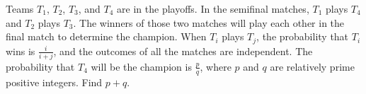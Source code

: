 Teams $T_1$,  $T_2$,  $T_3$,  and $T_4$ are in the playoffs. In the semifinal matches, $T_1$ plays $T_4$ and $T_2$ plays $T_3$. The winners of those two matches will play each other in the final match to determine the champion. When $T_i$ plays $T_j$,  the probability that $T_i$ wins is $\frac{i}{i+j}$,  and the outcomes of all the matches are independent. The probability that $T_4$ will be the champion is $\frac{p}{q}$,  where $p$ and $q$ are relatively prime positive integers. Find $p+q$.